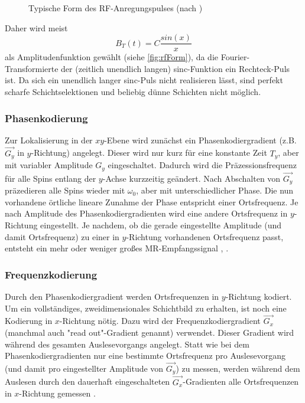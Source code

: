 \begin{figure}[H]
	\centering
	\caption[Form des RF-Anregungspulses]{Typische Form des RF-Anregungspulses (nach \cite[S.~326]{Doessel2016})}
	\label{fig:rfForm}
\end{figure}

Daher wird meist
\begin{equation}
	B_T(t)=C \frac{sin(x)}{x}
\end{equation}
als Amplitudenfunktion gewählt (siehe \autoref{fig:rfForm}), da die Fourier-Transformierte der (zeitlich unendlich langen) sinc-Funktion ein Rechteck-Puls ist. Da sich ein unendlich langer sinc-Puls nicht realisieren lässt, sind perfekt scharfe Schichtselektionen und beliebig dünne Schichten nicht möglich.

\subsubsection{Phasenkodierung}
Zur Lokalisierung in der $xy$-Ebene wird zunächst ein Phasenkodiergradient (z.B. $\vec{G_y}$ in $y$-Richtung) angelegt. Dieser wird nur kurz für eine konstante Zeit $T_y$, aber mit variabler Amplitude $G_y$ eingeschaltet. Dadurch wird die Präzessionsfrequenz für alle Spins entlang der $y$-Achse kurzzeitig geändert. Nach Abschalten von $\vec{G_y}$ präzedieren alle Spins wieder mit $\omega_0$, aber mit unterschiedlicher Phase. Die nun vorhandene örtliche lineare Zunahme der Phase entspricht einer Ortsfrequenz. Je nach Amplitude des Phasenkodiergradienten wird eine andere Ortsfrequenz in $y$-Richtung eingestellt. Je nachdem, ob die gerade eingestellte Amplitude (und damit Ortsfrequenz) zu einer in $y$-Richtung vorhandenen Ortsfrequenz passt, entsteht ein mehr oder weniger großes MR-Empfangssignal \cite{Bushong2014}, \cite{Edelstein1980}.

\subsubsection{Frequenzkodierung}
Durch den Phasenkodiergradient werden Ortsfrequenzen in $y$-Richtung kodiert. Um ein vollständiges, zweidimensionales Schichtbild zu erhalten, ist noch eine Kodierung in $x$-Richtung nötig. Dazu wird der Frequenzkodiergradient $\vec{G_x}$ (manchmal auch "read out"-Gradient genannt) verwendet. Dieser Gradient wird während des gesamten Auslesevorgangs angelegt. Statt wie bei dem Phasenkodiergradienten nur eine bestimmte Ortsfrequenz pro Auslesevorgang (und damit pro eingestellter Amplitude von $\vec{G_y}$) zu messen, werden während dem Auslesen durch den dauerhaft eingeschalteten $\vec{G_x}$-Gradienten alle Ortsfrequenzen in $x$-Richtung gemessen \cite{Bushong2014}.

